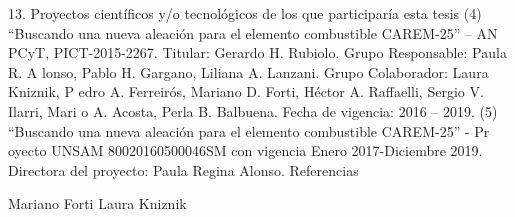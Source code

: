 13. Proyectos científicos y/o tecnológicos de los que participaría esta tesis 
    (4) “Buscando una nueva aleación para el elemento combustible CAREM-25” – AN
PCyT, PICT-2015-2267. Titular: Gerardo H. Rubiolo. Grupo Responsable: Paula R. A
lonso, Pablo H. Gargano, Liliana A. Lanzani. Grupo Colaborador: Laura Kniznik, P
edro A. Ferreirós, Mariano D. Forti, Héctor A. Raffaelli, Sergio V. Ilarri, Mari
o A. Acosta, Perla B. Balbuena. Fecha de vigencia: 2016 – 2019.
    (5) “Buscando una nueva aleación para el elemento combustible CAREM-25” - Pr
oyecto UNSAM 80020160500046SM con vigencia Enero 2017-Diciembre 2019. Directora 
del proyecto: Paula Regina Alonso.
       Referencias













Mariano Forti
Laura Kniznik
